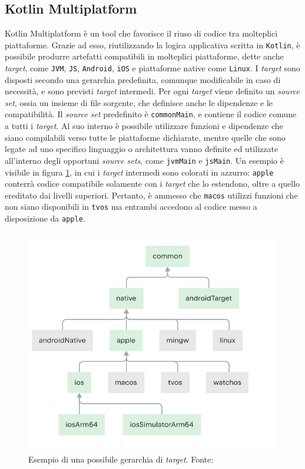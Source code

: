 \documentclass[12pt,a4paper,openright,twoside]{book}
\begin{document}
\subsection{Kotlin Multiplatform}
Kotlin Multiplatform è un tool che favorisce il riuso di codice tra molteplici piattaforme.
Grazie ad esso, riutilizzando la logica applicativa scritta in \texttt{Kotlin}, è possibile produrre artefatti compatibili
in molteplici piattaforme, dette anche \textit{target}, come \texttt{JVM}, \texttt{JS}, \texttt{Android}, \texttt{iOS} e piattaforme native come \texttt{Linux}.
I \textit{target} sono disposti secondo una gerarchia predefinita, comunque modificabile in caso di necessità, e sono previsti \textit{target} intermedi.
Per ogni \textit{target} viene definito un \textit{source set}, ossia un insieme di file sorgente, che definisce anche le dipendenze e le compatibilità.
Il \textit{source set} predefinito è \texttt{commonMain}, e contiene il codice comune a tutti i \textit{target}.
Al suo interno è possibile utilizzare funzioni e dipendenze che siano compilabili verso tutte le piattaforme dichiarate, mentre quelle che
sono legate ad uno specifico linguaggio o architettura vanno definite ed utilizzate all'interno degli opportuni \textit{source sets},
come \texttt{jvmMain} e \texttt{jsMain}. 
Un esempio è visibile in figura \ref{fig:targets}, in cui i \textit{target} intermedi sono colorati in azzurro: \texttt{apple} conterrà
codice compatibile solamente con i \textit{target} che lo estendono, oltre a quello ereditato dai livelli superiori. Pertanto, è ammesso 
che \texttt{macos} utilizzi funzioni che non siano disponibili in \texttt{tvos} ma entrambi accedono al codice messo a disposizione da \texttt{apple}.

\begin{figure}[H]
    \centering
     \includegraphics[width=1\linewidth]{figures/mptargets.png}
     \caption{Esempio di una possibile gerarchia di \textit{target}. Fonte: \cite{WebsiteKotlinMultiPlatformTargets}}
    \label{fig:targets}
 \end{figure}
\end{document}
